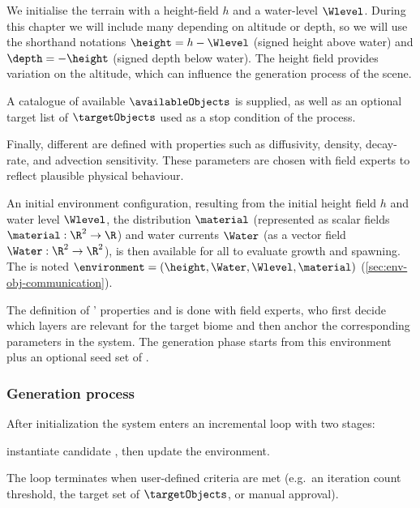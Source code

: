 We initialise the terrain with a height-field $h$ and a water-level $\Wlevel$. During this chapter we will include many  depending on altitude or depth, so we will use the shorthand notations $\height = h-\Wlevel$ (signed height above water) and $\depth=-\height$ (signed depth below water). The height field provides variation on the altitude, which can influence the generation process of the scene.

A catalogue of available  $\availableObjects$ is supplied, as well as an optional target list of  $\targetObjects$ used as a stop condition of the process.

Finally, different  are defined with properties such as diffusivity, density, decay-rate, and advection sensitivity. These parameters are chosen with field experts to reflect plausible physical behaviour.

An initial environment configuration, resulting from the initial height field $h$ and water level $\Wlevel$, the  distribution $\material$ (represented as scalar fields $\material: \R^2 \to \R$) and water currents $\Water$ (as a vector field $\Water: \R^2 \to \R^2$), is then available for all  to evaluate growth and spawning. The  is noted $\environment = (\height, \Water, \Wlevel, \material)$ (\cref{sec:env-obj-communication}).

The definition of ' properties and  is done with field experts, who first decide which  layers are relevant for the target biome and then anchor the corresponding parameters in the system.
The generation phase starts from this environment plus an optional seed set of .


\subsubsection{Generation process}

After initialization the system enters an incremental loop with two stages: 
\begin{Itemize}
    \Item{-} instantiate candidate , then  
    \Item{-} update the environment.  
\end{Itemize}
The loop terminates when user-defined criteria are met (e.g.\ an iteration count threshold, the target set of  $\targetObjects$, or manual approval).


